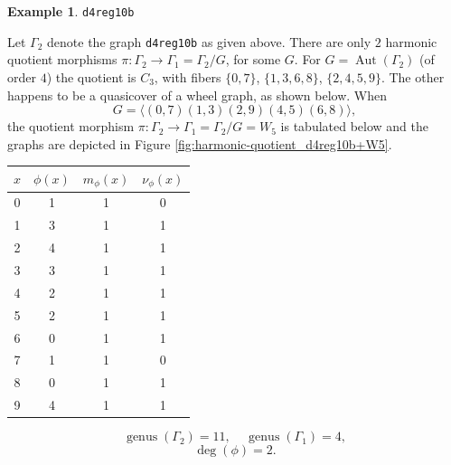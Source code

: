 \documentclass[12pt,letterpaper]{article}
\theoremstyle{definition}
\newtheorem{example}[theorem]{Example}
\DeclareMathOperator{\Aut}{Aut}
\DeclareMathOperator{\genus}{genus}
\begin{document}
\begin{example}%
\label{example:d4reg10b}
 {\tt d4reg10b}\newline
{\rm  
  Let $\Gamma_2$ denote the graph {\tt d4reg10b} as given above.
There are only $2$ harmonic quotient morphisms
$\pi: \Gamma_2\to \Gamma_1=\Gamma_2/G$, for some $G$.
For $G=\Aut(\Gamma_2)$ (of order $4$) the quotient is $C_3$, with fibers
$\{0,7\}$, $\{1,3,6,8\}$, $\{2,4,5,9\}$.
The other happens to be a quasicover of a wheel graph, as shown below.
When
\[
G = \langle (0,7)(1,3)(2,9)(4,5)(6,8) \rangle ,
\]
the quotient morphism
$\pi: \Gamma_2\to \Gamma_1=\Gamma_2/G = W_5$
is tabulated below and the graphs are depicted in
Figure \ref{fig:harmonic-quotient_d4reg10b+W5}.

\begin{center}
\begin{tabular}{c|c|c|c}  
  $x$ & $\phi(x)$ & $m_\phi(x)$ & $\nu_\phi(x)$ \\ \hline
  0   &    1   &        1         &  0   \\ 
  1   &    3   &        1         &  1  \\ 
  2   &    4   &        1         &  1  \\ 
  3   &    3   &        1         &  1  \\ 
  4   &    2   &        1         &  1   \\
  5   &    2   &        1         &  1   \\
  6   &    0   &        1         &  1   \\
  7   &    1   &        1         &  0   \\
  8   &    0   &        1         &  1   \\
  9   &    4   &        1         &  1   \\     
\end{tabular}
\end{center}

\[
  \genus(\Gamma_2) =11,\ \ \ \ \
  \genus(\Gamma_1) =4,
\]
\[
\deg(\phi) =2.
\]

}
\end{example}
\end{document}
